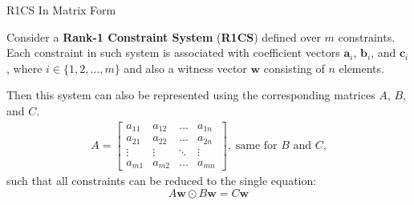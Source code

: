 \documentclass{zkdl-presentation-template}
\begin{document}
    \begin{frame}{R1CS In Matrix Form}
        \begin{theorem} 
            Consider a \textbf{Rank-1 Constraint System} (\textbf{R1CS}) defined over $m$ constraints. Each constraint in such system is
            associated with coefficient vectors $\boldsymbol{a}_i$, $\boldsymbol{b}_i$, and $\boldsymbol{c}_i$, where $i \in \{1, 2, \dots, m\}$ and
            also a witness vector $\boldsymbol{w}$ consisting of $n$ elements.
        
            Then this system can also be represented using the corresponding matrices $A$, $B$, and $C$.
            \begin{align*}
                A = \begin{bmatrix}
                    a_{11} & a_{12} & \dots & a_{1n} \\
                    a_{21} & a_{22} & \dots & a_{2n} \\
                    \vdots & \vdots & \ddots & \vdots \\
                    a_{m1} & a_{m2} & \dots & a_{mn}
                \end{bmatrix}, \; \text{same for $B$ and $C$,}
            \end{align*}
            such that all constraints can be reduced to the single equation:
            \begin{equation*}
                A\boldsymbol{w} \odot B\boldsymbol{w} = C\boldsymbol{w}
            \end{equation*}
        \end{theorem}
    \end{frame}
\end{document}
